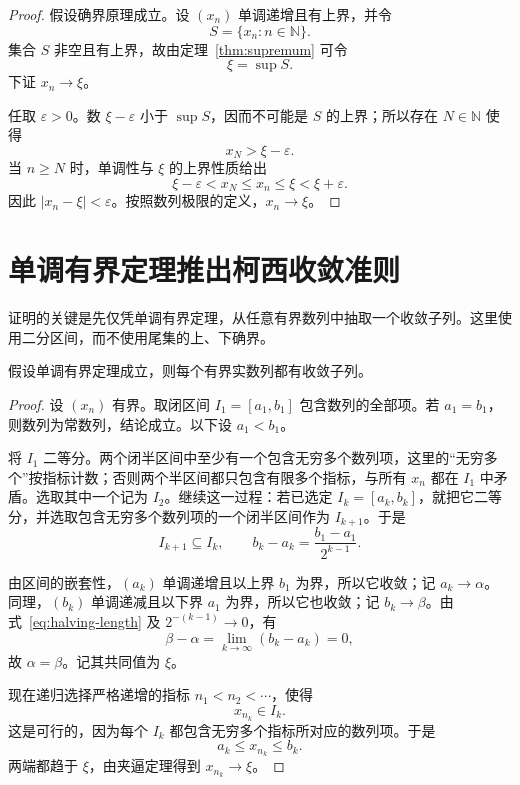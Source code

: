 \documentclass[UTF8,12pt,a4paper,fontset=fandol,oneside]{ctexart}
\begin{document}
\begin{proof}
  假设确界原理成立。设 $(x_n)$ 单调递增且有上界，并令
  \[
    S=\{x_n:n\in\mathbb N\}.
  \]
  集合 $S$ 非空且有上界，故由定理~\ref{thm:supremum} 可令
  \[
    \xi=\sup S.
  \]
  下证 $x_n\to\xi$。

  任取 $\varepsilon>0$。数 $\xi-\varepsilon$ 小于 $\sup S$，因而不可能是 $S$ 的上界；所以存在 $N\in\mathbb N$ 使得
  \[
    x_N>\xi-\varepsilon.
  \]
  当 $n\geq N$ 时，单调性与 $\xi$ 的上界性质给出
  \[
    \xi-\varepsilon<x_N\leq x_n\leq\xi<\xi+\varepsilon.
  \]
  因此 $|x_n-\xi|<\varepsilon$。按照数列极限的定义，$x_n\to\xi$。
\end{proof}

\section{单调有界定理推出柯西收敛准则}

证明的关键是先仅凭单调有界定理，从任意有界数列中抽取一个收敛子列。这里使用二分区间，而不使用尾集的上、下确界。

\begin{lemma}[有界数列的收敛子列]
  \label{lem:bounded-subsequence}
  假设单调有界定理成立，则每个有界实数列都有收敛子列。
\end{lemma}

\begin{proof}
  设 $(x_n)$ 有界。取闭区间 $I_1=[a_1,b_1]$ 包含数列的全部项。若 $a_1=b_1$，则数列为常数列，结论成立。以下设 $a_1<b_1$。

  将 $I_1$ 二等分。两个闭半区间中至少有一个包含无穷多个数列项，这里的“无穷多个”按指标计数；否则两个半区间都只包含有限多个指标，与所有 $x_n$ 都在 $I_1$ 中矛盾。选取其中一个记为 $I_2$。继续这一过程：若已选定 $I_k=[a_k,b_k]$，就把它二等分，并选取包含无穷多个数列项的一个闭半区间作为 $I_{k+1}$。于是
  \begin{equation}
    I_{k+1}\subseteq I_k,
    \qquad
    b_k-a_k=\frac{b_1-a_1}{2^{k-1}}.
    \label{eq:halving-length}
  \end{equation}

  由区间的嵌套性，$(a_k)$ 单调递增且以上界 $b_1$ 为界，所以它收敛；记 $a_k\to\alpha$。同理，$(b_k)$ 单调递减且以下界 $a_1$ 为界，所以它也收敛；记 $b_k\to\beta$。由式~\eqref{eq:halving-length} 及 $2^{-(k-1)}\to0$，有
  \[
    \beta-\alpha
    =\lim_{k\to\infty}(b_k-a_k)=0,
  \]
  故 $\alpha=\beta$。记其共同值为 $\xi$。

  现在递归选择严格递增的指标 $n_1<n_2<\cdots$，使得
  \[
    x_{n_k}\in I_k.
  \]
  这是可行的，因为每个 $I_k$ 都包含无穷多个指标所对应的数列项。于是
  \[
    a_k\leq x_{n_k}\leq b_k.
  \]
  两端都趋于 $\xi$，由夹逼定理得到 $x_{n_k}\to\xi$。
\end{proof}
\end{document}
